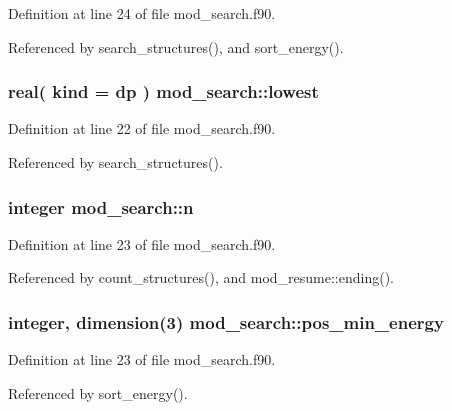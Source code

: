 Definition at line 24 of file mod\+\_\+search.\+f90.



Referenced by search\+\_\+structures(), and sort\+\_\+energy().

\subsubsection[{\texorpdfstring{lowest}{lowest}}]{\setlength{\rightskip}{0pt plus 5cm}real( kind = dp ) mod\+\_\+search\+::lowest}\hypertarget{namespacemod__search_a014567a8f5474b311cedf2f9b1dbda1a}{}\label{namespacemod__search_a014567a8f5474b311cedf2f9b1dbda1a}


Definition at line 22 of file mod\+\_\+search.\+f90.



Referenced by search\+\_\+structures().

\subsubsection[{\texorpdfstring{n}{n}}]{\setlength{\rightskip}{0pt plus 5cm}integer mod\+\_\+search\+::n}\hypertarget{namespacemod__search_a0c7388c12d8e6a95b8c3f9fd86321687}{}\label{namespacemod__search_a0c7388c12d8e6a95b8c3f9fd86321687}


Definition at line 23 of file mod\+\_\+search.\+f90.



Referenced by count\+\_\+structures(), and mod\+\_\+resume\+::ending().

\subsubsection[{\texorpdfstring{pos\+\_\+min\+\_\+energy}{pos_min_energy}}]{\setlength{\rightskip}{0pt plus 5cm}integer, dimension(3) mod\+\_\+search\+::pos\+\_\+min\+\_\+energy}\hypertarget{namespacemod__search_a018a3c64ea9e25b0dfc15ebe763920cf}{}\label{namespacemod__search_a018a3c64ea9e25b0dfc15ebe763920cf}


Definition at line 23 of file mod\+\_\+search.\+f90.



Referenced by sort\+\_\+energy().

